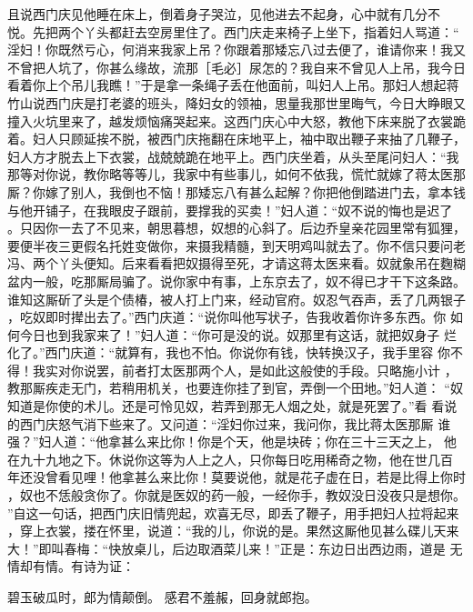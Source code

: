 且说西门庆见他睡在床上，倒着身子哭泣，见他进去不起身，心中就有几分不
悦。先把两个丫头都赶去空房里住了。西门庆走来椅子上坐下，指着妇人骂道：“
淫妇！你既然亏心，何消来我家上吊？你跟着那矮忘八过去便了，谁请你来！我又
不曾把人坑了，你甚么缘故，流那［毛必］尿怎的？我自来不曾见人上吊，我今日
看着你上个吊儿我瞧！”于是拿一条绳子丢在他面前，叫妇人上吊。那妇人想起蒋
竹山说西门庆是打老婆的班头，降妇女的领袖，思量我那世里晦气，今日大睁眼又
撞入火坑里来了，越发烦恼痛哭起来。这西门庆心中大怒，教他下床来脱了衣裳跪
着。妇人只顾延挨不脱，被西门庆拖翻在床地平上，袖中取出鞭子来抽了几鞭子，
妇人方才脱去上下衣裳，战兢兢跪在地平上。西门庆坐着，从头至尾问妇人：“我
那等对你说，教你略等等儿，我家中有些事儿，如何不依我，慌忙就嫁了蒋太医那
厮？你嫁了别人，我倒也不恼！那矮忘八有甚么起解？你把他倒踏进门去，拿本钱
与他开铺子，在我眼皮子跟前，要撑我的买卖！”妇人道：“奴不说的悔也是迟了
。只因你一去了不见来，朝思暮想，奴想的心斜了。后边乔皇亲花园里常有狐狸，
要便半夜三更假名托姓变做你，来摄我精髓，到天明鸡叫就去了。你不信只要问老
冯、两个丫头便知。后来看看把奴摄得至死，才请这蒋太医来看。奴就象吊在麴糊
盆内一般，吃那厮局骗了。说你家中有事，上东京去了，奴不得已才干下这条路。
谁知这厮斫了头是个债椿，被人打上门来，经动官府。奴忍气吞声，丢了几两银子
，吃奴即时撵出去了。”西门庆道：“说你叫他写状子，告我收着你许多东西。你
如何今日也到我家来了！”妇人道：“你可是没的说。奴那里有这话，就把奴身子
烂化了。”西门庆道：“就算有，我也不怕。你说你有钱，快转换汉子，我手里容
你不得！我实对你说罢，前者打太医那两个人，是如此这般使的手段。只略施小计
，教那厮疾走无门，若稍用机关，也要连你挂了到官，弄倒一个田地。”妇人道：
“奴知道是你使的术儿。还是可怜见奴，若弄到那无人烟之处，就是死罢了。”看
看说的西门庆怒气消下些来了。又问道：“淫妇你过来，我问你，我比蒋太医那厮
谁强？”妇人道：“他拿甚么来比你！你是个天，他是块砖；你在三十三天之上，
他在九十九地之下。休说你这等为人上之人，只你每日吃用稀奇之物，他在世几百
年还没曾看见哩！他拿甚么来比你！莫要说他，就是花子虚在日，若是比得上你时
，奴也不恁般贪你了。你就是医奴的药一般，一经你手，教奴没日没夜只是想你。
”自这一句话，把西门庆旧情兜起，欢喜无尽，即丢了鞭子，用手把妇人拉将起来
，穿上衣裳，搂在怀里，说道：“我的儿，你说的是。果然这厮他见甚么碟儿天来
大！”即叫春梅：“快放桌儿，后边取酒菜儿来！”正是：东边日出西边雨，道是
无情却有情。有诗为证：

碧玉破瓜时，郎为情颠倒。
感君不羞赧，回身就郎抱。